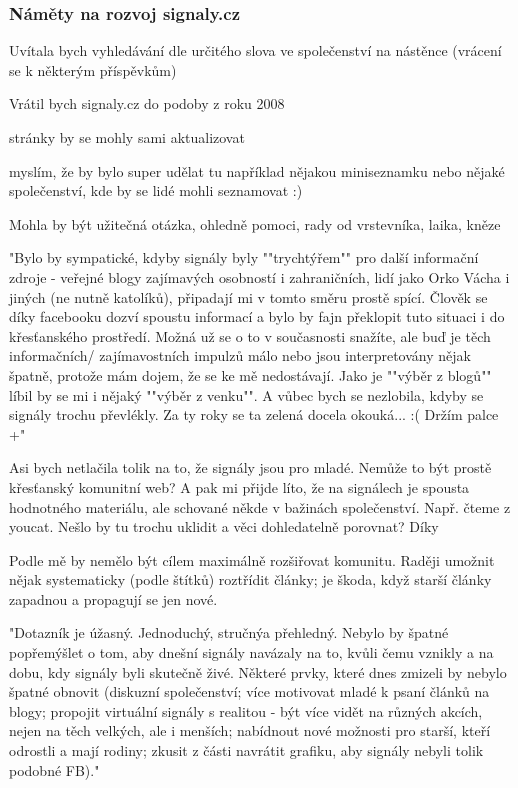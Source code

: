\subsubsection{Náměty na rozvoj signaly.cz}

\setlength{\parskip}{0.3cm}

Uvítala bych vyhledávání dle určitého slova ve společenství na nástěnce (vrácení se k některým příspěvkům)

Vrátil bych signaly.cz do podoby z roku 2008

stránky by se mohly sami aktualizovat

myslím, že by bylo super udělat tu například nějakou miniseznamku nebo nějaké společenství, kde by se lidé mohli seznamovat :)

Mohla by být užitečná otázka, ohledně pomoci, rady od vrstevníka, laika, kněze

"Bylo by sympatické, kdyby signály byly ""trychtýřem"" pro další informační zdroje - veřejné blogy zajímavých osobností i zahraničních, lidí jako Orko Vácha i jiných (ne nutně katolíků), připadají mi v tomto směru prostě spící. Člověk se díky facebooku dozví spoustu informací a bylo by fajn překlopit tuto situaci i do křesťanského prostředí. Možná už se o to v současnosti snažíte, ale buď je těch informačních/ zajímavostních impulzů málo nebo jsou interpretovány nějak špatně, protože mám dojem, že se ke mě nedostávají. Jako je ""výběr z blogů"" líbil by se mi i nějaký ""výběr z venku"".
 A vůbec bych se nezlobila, kdyby se signály trochu převlékly. Za ty roky se ta zelená docela okouká... :(
Držím palce +"

Asi bych netlačila tolik na to, že signály jsou pro mladé. Nemůže to být prostě křesťanský komunitní web? A pak mi přijde líto, že na signálech je spousta hodnotného materiálu, ale schované někde v bažinách společenství. Např. čteme z youcat. Nešlo by tu trochu uklidit a věci dohledatelně porovnat? Díky

Podle mě by nemělo být cílem maximálně rozšiřovat komunitu. Raději umožnit nějak systematicky (podle štítků) roztřídit články; je škoda, když starší články zapadnou a propagují se jen nové.

"Dotazník je úžasný. Jednoduchý, stručnýa  přehledný.
Nebylo by špatné popřemýšlet o tom, aby dnešní signály navázaly na to, kvůli čemu vznikly a na dobu, kdy signály byli skutečně živé.
Některé prvky, které dnes zmizeli by nebylo špatné obnovit (diskuzní společenství; více motivovat mladé k psaní článků na blogy; propojit virtuální signály s realitou - být více vidět na různých akcích, nejen na těch velkých, ale i menších; nabídnout nové možnosti pro starší, kteří odrostli a mají rodiny; zkusit z části navrátit grafiku, aby signály nebyli tolik podobné FB)."

